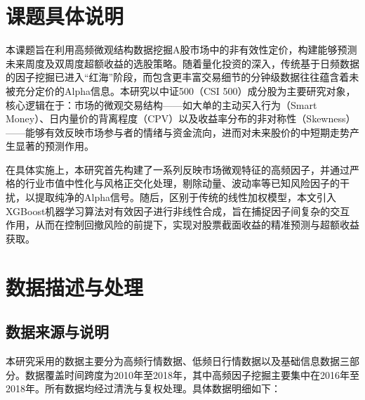 \documentclass[10pt,compsoc,UTF8]{CjC}
\begin{document}
\setpage

\Title{\themytitle}{\themyauthor}{\themystudentid}


\tableofcontents

\clearpage

\section{课题具体说明}
本课题旨在利用高频微观结构数据挖掘A股市场中的非有效性定价，构建能够预测未来周度及双周度超额收益的选股策略。随着量化投资的深入，传统基于日频数据的因子挖掘已进入“红海”阶段，而包含更丰富交易细节的分钟级数据往往蕴含着未被充分定价的Alpha信息。本研究以中证500（CSI 500）成分股为主要研究对象，核心逻辑在于：市场的微观交易结构——如大单的主动买入行为（Smart Money）、日内量价的背离程度（CPV）以及收益率分布的非对称性（Skewness）——能够有效反映市场参与者的情绪与资金流向，进而对未来股价的中短期走势产生显著的预测作用。

在具体实施上，本研究首先构建了一系列反映市场微观特征的高频因子，并通过严格的行业市值中性化与风格正交化处理，剔除动量、波动率等已知风险因子的干扰，以提取纯净的Alpha信号。随后，区别于传统的线性加权模型，本文引入XGBoost机器学习算法对有效因子进行非线性合成，旨在捕捉因子间复杂的交互作用，从而在控制回撤风险的前提下，实现对股票截面收益的精准预测与超额收益获取。

\section{数据描述与处理}
\subsection{数据来源与说明}
本研究采用的数据主要分为高频行情数据、低频日行情数据以及基础信息数据三部分。数据覆盖时间跨度为2010年至2018年，其中高频因子挖掘主要集中在2016年至2018年。所有数据均经过清洗与复权处理。具体数据明细如下：
\end{document}
